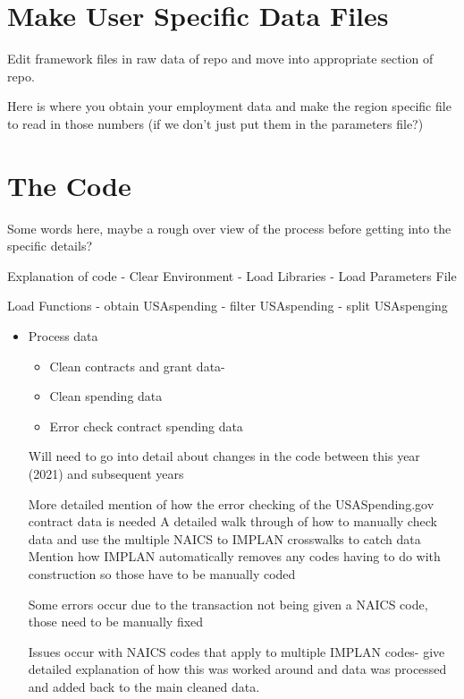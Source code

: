 \documentclass[
]{book}
\providecommand{\tightlist}{%
  \setlength{\itemsep}{0pt}\setlength{\parskip}{0pt}}
\begin{document}
\hypertarget{make-user-specific-data-files}{%
\section{Make User Specific Data Files}\label{make-user-specific-data-files}}

Edit framework files in raw data of repo and move into appropriate section of repo.

Here is where you obtain your employment data and make the region specific file to read in those numbers (if we don't just put them in the parameters file?)

\hypertarget{the-code}{%
\section{The Code}\label{the-code}}

Some words here, maybe a rough over view of the process before getting into the specific details?

Explanation of code
- Clear Environment
- Load Libraries
- Load Parameters File

Load Functions
- obtain USAspending
- filter USAspending
- split USAspenging

\begin{itemize}
\item
  Process data

  \begin{itemize}
  \tightlist
  \item
    Clean contracts and grant data-
  \item
    Clean spending data
  \item
    Error check contract spending data
  \end{itemize}

  Will need to go into detail about changes in the code between this year (2021) and subsequent years

  More detailed mention of how the error checking of the USASpending.gov contract data is needed
  A detailed walk through of how to manually check data and use the multiple NAICS to IMPLAN crosswalks to catch data
  Mention how IMPLAN automatically removes any codes having to do with construction so those have to be manually coded

  Some errors occur due to the transaction not being given a NAICS code, those need to be manually fixed

  Issues occur with NAICS codes that apply to multiple IMPLAN codes- give detailed explanation of how this was worked around and data was processed and added back to the main cleaned data.
\end{itemize}
\end{document}
